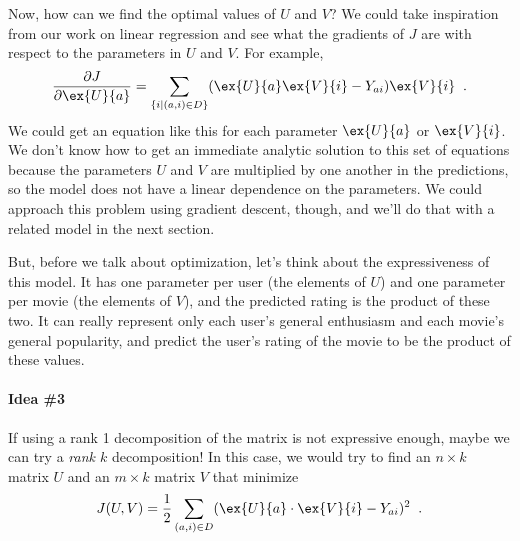 Now, how can we find the optimal values of $U$ and $V$?  We could take
inspiration from our work on linear regression and see what the
gradients of $J$ are with respect to the parameters in $U$ and $V$.
For example, 
\[
  \frac{\partial J}{\partial \ex{U}{a}} = \sum_{\{i \mid (a,i) \in D\}}
  (\ex{U}{a}\ex{V}{i} - Y_{ai})\ex{V}{i} \;\;.
\]
We could get an equation like this for each parameter $\ex{U}{a}$ or
$\ex{V}{i}$.  We don't know how to get an immediate analytic solution
to this set of equations because the parameters $U$ and $V$ are
multiplied by one another in the predictions, so the model does not
have a linear dependence on the parameters.  We could approach this
problem using gradient descent, though, and we'll do that with a
related model in the next section.

But, before we talk about optimization, let's think about the
expressiveness of this model.  It has one parameter per user (the
elements of $U$) and one parameter per movie (the elements of $V$),
and the predicted rating is the product of these two.  It can really
represent only each user's general enthusiasm and each movie's general
popularity, and predict the user's rating of the movie to be the
product of these values.

\paragraph*{Idea \#3}
If using a rank 1 decomposition of the matrix is not expressive
enough, maybe we can try a {\em rank $k$} decomposition!   In this
case, we would try to find an  $n\times k$
matrix $U$ and an $m \times k$ matrix $V$ that minimize
\[J(U,V) = \frac{1}{2} \sum_{(a,i)\in D} (\ex{U}{a} \cdot \ex{V}{i}
  - Y_{ai})^2\;\;.\]

\begin{center}
\end{center}



